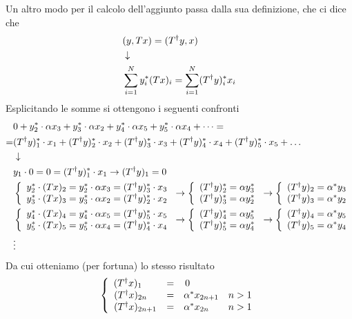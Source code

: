 Un altro modo per il calcolo dell'aggiunto passa dalla sua definizione, che ci dice che
\begin{align}
	&(y,Tx) = (T^\dagger y,x) \\ &\downarrow \nonumber \\
	&\sum_{i=1}^{N} y^*_i (Tx)_i = \sum_{i=1}^{N} (T^\dagger y)_i^* x_i
\end{align}
Esplicitando le somme si ottengono i seguenti confronti
\begin{align}
	&0 + y_2^* \cdot \alpha x_3 + y_3^* \cdot \alpha x_2 + y_4^* \cdot \alpha x_5 + y_5^* \cdot \alpha x_4 + \dots =  \nonumber \\
	=&(T^\dagger y)_1^* \cdot x_1 + (T^\dagger y)_2^* \cdot x_2 +(T^\dagger y)_3^* \cdot x_3 +(T^\dagger y)_4^* \cdot x_4 + (T^\dagger y)_5^* \cdot x_5 + \dots\\ &\downarrow \nonumber \\
	&y_1 \cdot 0 = 0  = (T^\dagger y)_1^* \cdot x_1 \to (T^\dagger y)_1 = 0\\
	&\left\{ \begin{array}{cc} y_2^* \cdot (Tx)_2 = y_2^* \cdot \alpha x_3 = (T^\dagger y)_3^* \cdot x_3\\ y_3^* \cdot (Tx)_3 = y_3^* \cdot \alpha x_2 = (T^\dagger y)_2^*\cdot x_2 \end{array} \right. \to  \left\{ \begin{array}{cc} (T^\dagger y)_2^* = \alpha y_3^*\\ (T^\dagger y)_3^* = \alpha y_2^* \end{array} \right. \to  \left\{ \begin{array}{cc} (T^\dagger y)_2
		= \alpha^* y_3\\ (T^\dagger y)_3 = \alpha^* y_2 \end{array} \right.\\
	&\left\{ \begin{array}{cc} y_4^* \cdot (Tx)_4 = y_4^* \cdot \alpha x_5 = (T^\dagger y)_5^*\cdot x_5\\ y_5^* \cdot (Tx)_5 = y_5^* \cdot \alpha x_4 = (T^\dagger y)_4^*\cdot x_4 \end{array} \right. \to \left\{ \begin{array}{cc} (T^\dagger y)_4^* = \alpha y_5^*\\ (T^\dagger y)_5^* = \alpha y_4^* \end{array} \right.\to \left\{ \begin{array}{cc} (T^\dagger y)_4 = \alpha^* y_5\\ (T^\dagger y)_5 = \alpha^* y_4 \end{array} \right.\\
	&\vdots \nonumber
\end{align}
Da cui otteniamo (per fortuna) lo stesso risultato
\begin{align}
	\left\{ \begin{array}{ccc} (T^\dagger x)_1 \quad\;\; &= &0 \;\qquad \qquad \qquad\\ (T^\dagger x)_{2n} \quad &= &\alpha^* x_{2n+1} \quad n> 1\\ (T^\dagger x)_{2n+1} &= &\alpha^* x_{2n} \quad\quad n> 1 \end{array} \right.
\end{align}




